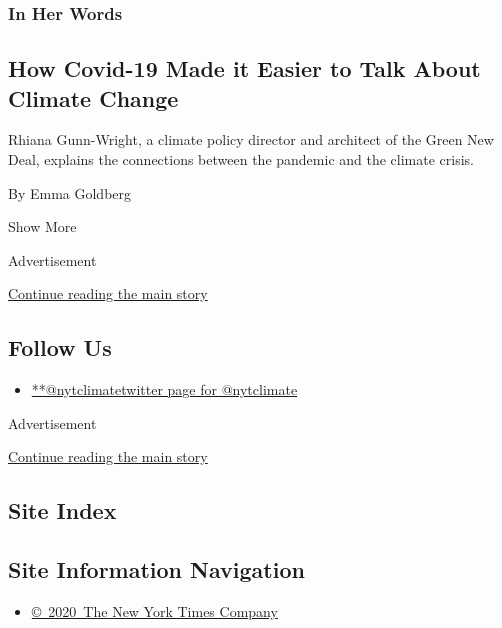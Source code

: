 \begin{enumerate}
  \hypertarget{in-her-words}{%
  \subsubsection{In Her Words}\label{in-her-words}}

  \hypertarget{how-covid-19-made-it-easier-to-talk-about-climate-change}{%
  \subsection{How Covid-19 Made it Easier to Talk About Climate
  Change}\label{how-covid-19-made-it-easier-to-talk-about-climate-change}}

  Rhiana Gunn-Wright, a climate policy director and architect of the
  Green New Deal, explains the connections between the pandemic and the
  climate crisis.

  By Emma Goldberg
\end{enumerate}

Show More

Advertisement

\protect\hyperlink{after-mid2}{Continue reading the main story}

\hypertarget{follow-us}{%
\subsection{Follow Us}\label{follow-us}}

\begin{itemize}
\tightlist
\item
  \href{https://twitter.com/nytclimate}{**@nytclimatetwitter page for
  @nytclimate}
\end{itemize}

Advertisement

\protect\hyperlink{after-mktg}{Continue reading the main story}

\hypertarget{site-index}{%
\subsection{Site Index}\label{site-index}}

\hypertarget{site-information-navigation}{%
\subsection{Site Information
Navigation}\label{site-information-navigation}}

\begin{itemize}
\tightlist
\item
  \href{https://help.nytimes3xbfgragh.onion/hc/en-us/articles/115014792127-Copyright-notice}{©~2020~The
  New York Times Company}
\end{itemize}

